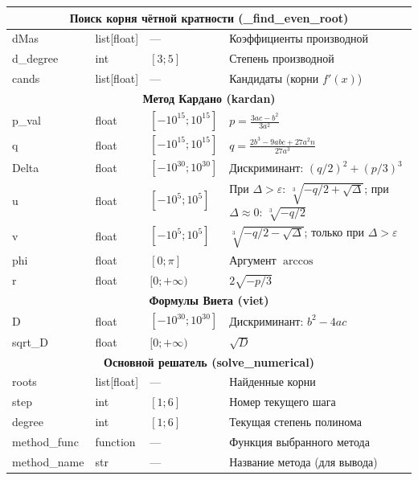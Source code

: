 \documentclass[a4paper,14pt]{extarticle}
\begin{document}
\begin{longtable}{|p{3cm}|p{2.5cm}|p{3cm}|p{5cm}|}
\multicolumn{4}{|c|}{\textbf{Поиск корня чётной кратности (\_find\_even\_root)}} \\
\hline
dMas & list[float] & --- & Коэффициенты производной \\
\hline
d\_degree & int & $[3;5]$ & Степень производной \\
\hline
cands & list[float] & --- & Кандидаты (корни $f'(x)$) \\
\hline

\multicolumn{4}{|c|}{\textbf{Метод Кардано (kardan)}} \\
\hline
p\_val & float & $[-10^{15}; 10^{15}]$ & $p = \frac{3ac-b^2}{3a^2}$ \\
\hline
q & float & $[-10^{15}; 10^{15}]$ & $q = \frac{2b^3-9abc+27a^2n}{27a^3}$ \\
\hline
Delta & float & $[-10^{30}; 10^{30}]$ & Дискриминант: $(q/2)^2+(p/3)^3$ \\
\hline
u & float & $[-10^{5}; 10^{5}]$ & При $\Delta>\varepsilon$: $\sqrt[3]{-q/2+\sqrt{\Delta}}$; при $\Delta\approx 0$: $\sqrt[3]{-q/2}$ \\
\hline
v & float & $[-10^{5}; 10^{5}]$ & $\sqrt[3]{-q/2-\sqrt{\Delta}}$; только при $\Delta>\varepsilon$ \\
\hline
phi & float & $[0;\pi]$ & Аргумент $\arccos$ \\
\hline
r & float & $[0;+\infty)$ & $2\sqrt{-p/3}$ \\
\hline

\multicolumn{4}{|c|}{\textbf{Формулы Виета (viet)}} \\
\hline
D & float & $[-10^{30}; 10^{30}]$ & Дискриминант: $b^2 - 4ac$ \\
\hline
sqrt\_D & float & $[0;+\infty)$ & $\sqrt{D}$ \\
\hline

\multicolumn{4}{|c|}{\textbf{Основной решатель (solve\_numerical)}} \\
\hline
roots & list[float] & --- & Найденные корни \\
\hline
step & int & $[1;6]$ & Номер текущего шага \\
\hline
degree & int & $[1;6]$ & Текущая степень полинома \\
\hline
method\_func & function & --- & Функция выбранного метода \\
\hline
method\_name & str & --- & Название метода (для вывода) \\
\hline

\end{longtable}
\end{document}
